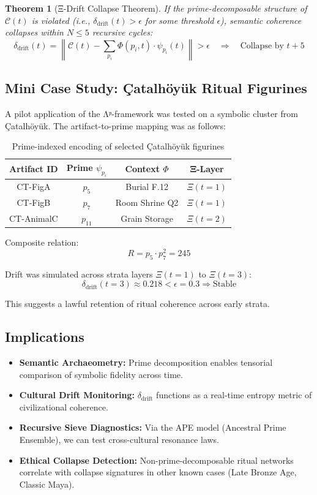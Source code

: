 \documentclass{article}
\theoremstyle{plain}
\newtheorem{theorem}{Theorem}
\begin{document}
\begin{theorem}[Ξ-Drift Collapse Theorem]
If the prime-decomposable structure of $\mathcal{C}(t)$ is violated (i.e., $\delta_{\text{drift}}(t) > \epsilon$ for some threshold $\epsilon$), semantic coherence collapses within $N \leq 5$ recursive cycles:
\[
\delta_{\text{drift}}(t) = \left\| \mathcal{C}(t) - \sum_{p_i} \Phi(p_i, t) \cdot \psi_{p_i}(t) \right\| > \epsilon \quad \Rightarrow \quad \text{Collapse by } t+5
\]
\end{theorem}

\subsection{Mini Case Study: Çatalhöyük Ritual Figurines}
A pilot application of the Λᵖ-framework was tested on a symbolic cluster from Çatalhöyük. The artifact-to-prime mapping was as follows:

\begin{table}[H]
\centering
\begin{tabular}{|c|c|c|c|}
\hline
\textbf{Artifact ID} & \textbf{Prime $\psi_{p_i}$} & \textbf{Context $\Phi$} & \textbf{Ξ-Layer} \\
\hline
CT-FigA & $p_5$ & Burial F.12 & $\Xi(t=1)$ \\
CT-FigB & $p_7$ & Room Shrine Q2 & $\Xi(t=1)$ \\
CT-AnimalC & $p_{11}$ & Grain Storage & $\Xi(t=2)$ \\
\hline
\end{tabular}
\caption{Prime-indexed encoding of selected Çatalhöyük figurines}
\end{table}

Composite relation:
\[
R = p_5 \cdot p_7^2 = 245
\]

Drift was simulated across strata layers $\Xi(t=1)$ to $\Xi(t=3)$:
\[
\delta_{\text{drift}}(t=3) \approx 0.218 < \epsilon = 0.3 \Rightarrow \text{Stable}
\]

This suggests a lawful retention of ritual coherence across early strata.

\subsection{Implications}

\begin{itemize}
    \item \textbf{Semantic Archaeometry:} Prime decomposition enables tensorial comparison of symbolic fidelity across time.
    \item \textbf{Cultural Drift Monitoring:} $δ_{\text{drift}}$ functions as a real-time entropy metric of civilizational coherence.
    \item \textbf{Recursive Sieve Diagnostics:} Via the APE model (Ancestral Prime Ensemble), we can test cross-cultural resonance laws.
    \item \textbf{Ethical Collapse Detection:} Non-prime-decomposable ritual networks correlate with collapse signatures in other known cases (Late Bronze Age, Classic Maya).
\end{itemize}
\end{document}
